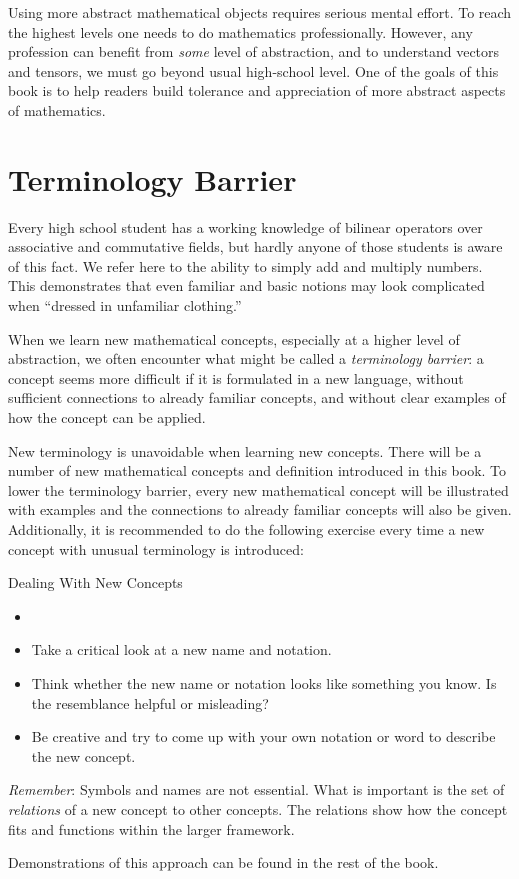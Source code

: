 Using more abstract mathematical objects requires serious mental
effort. To reach the highest levels one needs to do mathematics
professionally. However, any profession can benefit from \emph{some} level of
abstraction, and to understand vectors and tensors, we must go beyond
usual high-school level. One of the goals of this book is to help readers
build tolerance and appreciation of more abstract aspects of
mathematics.


\section{Terminology Barrier}
Every high school student has a working knowledge of bilinear operators
over associative and commutative fields, but hardly anyone of those
students is aware of this fact. We refer here to the ability to
simply add and multiply numbers. This demonstrates that even familiar
and basic notions may look complicated when ``dressed in unfamiliar
clothing.''

When we learn new mathematical concepts, especially at a higher level of
abstraction, we often encounter what might be called a
\emph{terminology barrier}: a concept seems
more difficult if it is
formulated in a new language, without sufficient connections to
already familiar concepts, and without clear examples of how the
concept can be applied.

New terminology is unavoidable when learning new concepts. There will
be a number of new mathematical concepts and definition introduced in
this book. To lower the terminology barrier, every new mathematical
concept will be illustrated with examples and the connections to
already familiar concepts will also be given. Additionally, it is
recommended to do the following exercise every time a new concept with
unusual terminology is introduced:

\begin{mybio}{Dealing With New Concepts}
  \begin{itemize}
    \item \phantom{x}
  \item Take a critical look at a new name and notation.
  \item Think whether the new name or notation looks like something
    you know. Is the resemblance helpful or misleading?
  \item Be creative and try to come up with your own notation or word
    to describe the new concept.
  \end{itemize}
  \vspace{0.1cm}
  \emph{Remember}: Symbols and names are not essential. What is
  important is the set of \emph{relations} of a new concept to other
  concepts. The relations show how the concept fits and functions
  within the larger framework.
\end{mybio}
Demonstrations of this approach can be found in the rest of the book.

